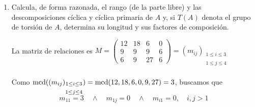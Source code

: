 \documentclass[12pt]{article}
\begin{document}
    \begin{ejercicio}
        \begin{enumerate}[label=(\alph*)]
            \item Calcula, de forma razonada, el rango (de la parte libre) y las descomposiciones cíclica y cíclica primaria de $A$ y, si $T(A)$ denota el grupo de torsión de $A$, determina su longitud y sus factores de composición.
            
            La matriz de relaciones es 
            $M = \begin{pmatrix}
                12 & 18 & 6 & 0 \\
                9 & 9 & 9 & 6 \\
                6 & 9 & 27 & 6
            \end{pmatrix} = (m_{ij})_{\substack{1\le i\le 3 \\\\ 1\le j\le 4}}$ \\\\
            Como $\operatorname{mcd}((m_{ij})_{\substack{1\le i\le 3 \\\\ 1\le j\le 4}}) = \operatorname{mcd}(12,18,6,0,9,27) = 3 $, buscamos que $$m_{11} = 3 \quad \land \quad m_{1j} = 0 \quad \land \quad m_{i1} = 0, \quad i,j>1$$


\end{enumerate}
\end{ejercicio}
\end{document}
